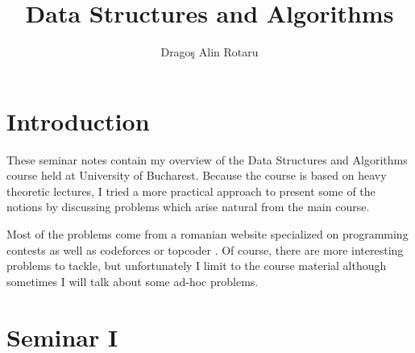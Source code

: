 \documentclass{llncs}
\begin{document}
\pagestyle{empty}


%
%
\title{Data Structures and Algorithms}
%
%
\author{Drago\c{s} Alin Rotaru}
%
%


\maketitle              %


\newpage

\section{Introduction}
\label{sec:intro}

These seminar notes contain my overview of the Data Structures and Algorithms course held at University of Bucharest. Because the course is based on heavy theoretic lectures, I tried a more practical approach to present some of the notions by discussing problems which arise natural from the main course.

Most of the problems come from a romanian website specialized on programming contests as well as codeforces or topcoder \cite{website:infoarena, website:topcoder, website:codeforces}. Of course, there are more interesting problems to tackle, but unfortunately I limit to the course material although sometimes I will talk about some ad-hoc problems.


\section{Seminar I}
\label{sec:seminar1}
\end{document}
